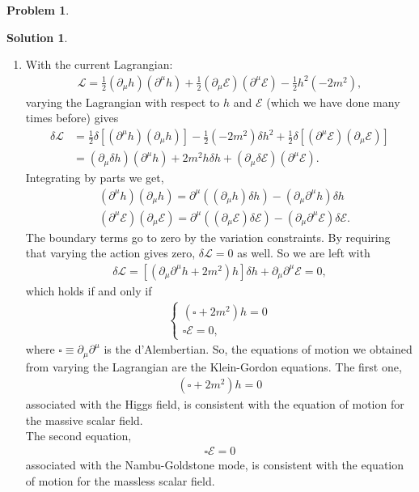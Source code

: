 \documentclass{book}
\numberwithin{equation}{section}
\theoremstyle{definition}
\newtheorem{prob}{Problem}[section]
\newtheorem{sln}{Solution}[section]
\newcommand{\p}{\partial}
\newcommand{\lag}{\mathcal{L}}
\newcommand{\E}{\mathcal{E}}
\begin{document}
\begin{prob}
\begin{sln}
\begin{enumerate}
			\item With the current Lagrangian:
			\begin{align}
			\lag = \frac{1}{2}\left(\p_\mu h\right)\left(\p^\mu h\right)+ \frac{1}{2}\left(\p_\mu\E\right)\left( \p^\mu\E\right) - \frac{1}{2}h^2(-2m^2),
			\end{align}
			varying the Lagrangian with respect to $h$ and $\E$ (which we have done many times before) gives
			\begin{align}
			\delta \lag &= \frac{1}{2}\delta\left[(\p^\mu h)(\p_\mu h)\right] - \frac{1}{2}(-2m^2)\delta h^2 + \frac{1}{2}\delta\left[(\p^\mu\E)( \p_\mu \E)\right]\nonumber\\
			&= (\p_\mu \delta h)(\p^\mu h) + 2m^2 h\delta h + (\p_\mu \delta \E )(\p^\mu \E).
			\end{align}
			Integrating by parts we get,
			\begin{align}
			&(\p^\mu h)( \p_\mu h) = \p^\mu \left((\p_\mu h)\delta h\right) - \left(\p_\mu\p^\mu h\right)\delta h\\
			&(\p^\mu \E) (\p_\mu \E )= \p^\mu \left((\p_\mu \E)\delta \E\right) - \left(\p_\mu\p^\mu \E\right)\delta \E.
			\end{align}
			The boundary terms go to zero by the variation constraints. By requiring that varying the action gives zero, $\delta \lag = 0$ as well. So we are left with
			\begin{align}
			\delta \lag = \left[(\p_\mu\p^\mu h + 2m^2)h\right]\delta h  + \p_\mu \p^\mu \E = 0,
			\end{align}
			which holds if and only if 
			\begin{align}
			\begin{cases}
			(\square + 2m^2)h = 0\\
			\square \E = 0,
			\end{cases}
			\end{align}
			where $\square\equiv \p_\mu\p^\mu$ is the d'Alembertian. So, the equations of motion we obtained from varying the Lagrangian are the Klein-Gordon equations. The first one,
			\begin{align}
			\boxed{\left(\square + 2m^2\right)h = 0}
			\end{align}
			associated with the Higgs field, is consistent with the equation of motion for the massive scalar field.\\
			
			The second equation,
			\begin{align}
			\boxed{\square \E = 0}
			\end{align}
			associated with the Nambu-Goldstone mode, is consistent with the equation of motion for the massless scalar field. \\
		\end{enumerate}
	\end{sln}
\end{prob}
\end{document}
